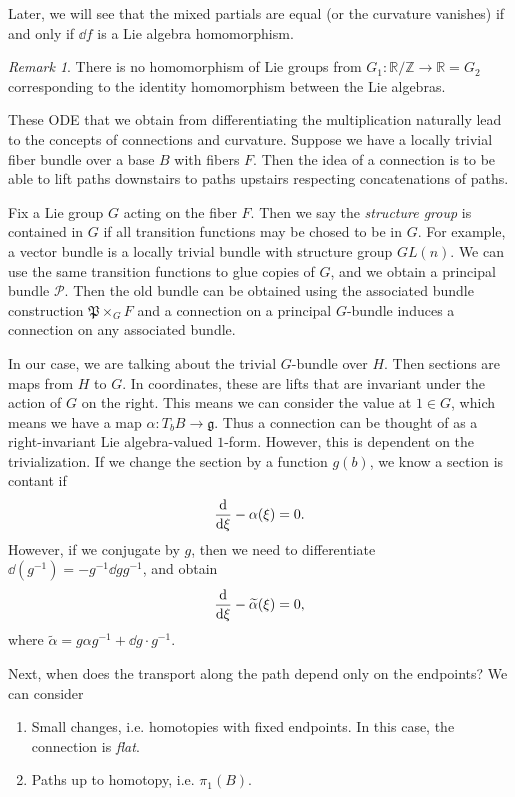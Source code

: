 \documentclass[leqno, openany]{memoir}
\theoremstyle{definition}
\theoremstyle{remark}
\newtheorem{rmk}[thm]{Remark}
\theoremstyle{plain}
\theoremstyle{definition}
\theoremstyle{remark}
\newcommand{\R}{\mathbb{R}}
\newcommand{\Z}{\mathbb{Z}}
\newcommand{\mc}[1]{\mathcal{#1}}
\newcommand{\mf}[1]{\mathfrak{#1}}
\newcommand{\wt}[1]{\widetilde{#1}}
\begin{document}
Later, we will see that the mixed partials are equal (or the curvature vanishes) if and only if $\dd f$ is a Lie algebra homomorphism.

\begin{rmk}
    There is no homomorphism of Lie groups from $G_1 \colon \R / \Z \to \R = G_2$ corresponding to the identity homomorphism between the Lie algebras.
\end{rmk}

These ODE that we obtain from differentiating the multiplication naturally lead to the concepts of connections and curvature. Suppose we have a locally trivial fiber bundle over a base $B$ with fibers $F$. Then the idea of a connection is to be able to lift paths downstairs to paths upstairs respecting concatenations of paths.

Fix a Lie group $G$ acting on the fiber $F$. Then we say the \textit{structure group} is contained in $G$ if all transition functions may be chosed to be in $G$. For example, a vector bundle is a locally trivial bundle with structure group $GL(n)$. We can use the same transition functions to glue copies of $G$, and we obtain a principal bundle $\mc{P}$. Then the old bundle can be obtained using the associated bundle construction $\mf{P} \times_G F$ and a connection on a principal $G$-bundle induces a connection on any associated bundle.

In our case, we are talking about the trivial $G$-bundle over $H$. Then sections are maps from $H$ to $G$. In coordinates, these are lifts that are invariant under the action of $G$ on the right. This means we can consider the value at $1 \in G$, which means we have a map $ \alpha \colon T_b B \to \mf{g}$. Thus a connection can be thought of as a right-invariant Lie algebra-valued $1$-form. However, this is dependent on the trivialization. If we change the section by a function $g(b)$, we know a section is contant if 
\[ \dv{\xi} - \alpha(\xi) = 0. \]
However, if we conjugate by $g$, then we need to differentiate $\dd (g^{-1}) = - g^{-1} \dd{g} g^{-1}$, and obtain
\[ \dv{\xi} - \wt{\alpha}(\xi) = 0, \]
where $\wt{\alpha} = g \alpha g^{-1} + \dd{g} \cdot g^{-1}$.

Next, when does the transport along the path depend only on the endpoints? We can consider
\begin{enumerate}
    \item Small changes, i.e. homotopies with fixed endpoints. In this case, the connection is \textit{flat}.
    \item Paths up to homotopy, i.e. $\pi_1(B)$.
\end{enumerate}
\end{document}
